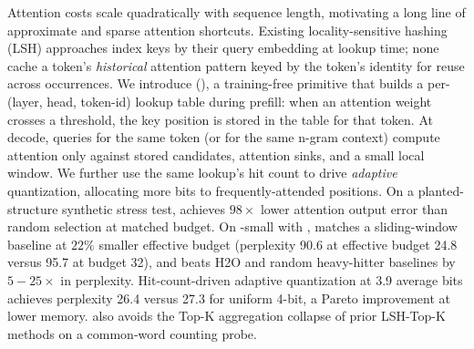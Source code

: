 Attention costs scale quadratically with sequence length, motivating a long line of approximate and sparse attention shortcuts. Existing locality-sensitive hashing (LSH) approaches index keys by their query embedding at lookup time; none cache a token's \emph{historical} attention pattern keyed by the token's identity for reuse across occurrences. We introduce \ours (\hma), a training-free primitive that builds a per-(layer, head, token-id) lookup table during prefill: when an attention weight crosses a threshold, the key position is stored in the table for that token. At decode, queries for the same token (or for the same n-gram context) compute attention only against stored candidates, attention sinks, and a small local window. We further use the same lookup's hit count to drive \emph{adaptive} \kvcache quantization, allocating more bits to frequently-attended positions. On a planted-structure synthetic stress test, \hma achieves $98\times$ lower attention output error than random selection at matched budget. On \gpttwo-small with \wikitext, \hma matches a sliding-window baseline at $22\%$ smaller effective \kvcache budget (perplexity 90.6 at effective budget 24.8 versus 95.7 at budget 32), and beats H2O and random heavy-hitter baselines by $5{-}25\times$ in perplexity. Hit-count-driven adaptive quantization at 3.9 average bits achieves perplexity 26.4 versus 27.3 for uniform 4-bit, a Pareto improvement at lower memory. \hma also avoids the Top-K aggregation collapse of prior LSH-Top-K methods on a common-word counting probe.
